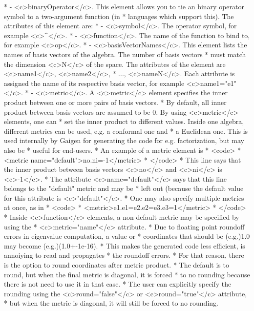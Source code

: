 \documentclass[10pt, a4paper]{article}
\begin{document}
\begin{itemize}
 *   - <c>binaryOperator</c>. This element allows you to tie an binary operator symbol to a two-argument function (in
 *     languages which support this). The attributes of this element are:
 *        - <c>symbol</c>. The operator symbol, for example <c>^</c>.
 *        - <c>function</c>. The name of the function to bind to, for example <c>op</c>.
 *   - <c>basisVectorNames</c>. This element lists the names of basis vectors of the algebra. The number of basis vectors
 *     must match the dimension <c>N</c> of the space. The attributes of the element are <c>name1</c>, <c>name2</c>, 
 *     ..., <c>nameN</c>. Each attribute is assigned the name of its respective basis vector, for example <c>name1="e1"</c>.
 *   - <c>metric</c>. A <c>metric</c> element specifies the inner product between one or more pairs of basis vectors.
 *     By default, all inner product between basis vectors are assumed to be 0. By using <c>metric</c> elements, one can
 *     set the inner product to different values. Inside one algebra, different metrics can be used, e.g. a conformal one and
 *     a Euclidean one. This is used internally by Gaigen for generating the code for e.g. factorization, but may also be
 *     useful for end-users.
 *     An example of a metric element is 
 *     <code>
 *     <metric name="default">no.ni=-1</metric>
 *     </code>
 *     This line says that the inner product between basis vectors <c>no</c> and <c>ni</c> is <c>-1</c>.
 *     The attribute <c>name="default"</c> says that this line belongs to the "default" metric and may be
 *     left out (because the default value for this attribute is <c>"default"</c>.
 *     One may also specify multiple metrics at once, as in
 *     <code>
 *     <metric>e1.e1=e2.e2=e3.e3=1</metric>
 *     </code>
 *     Inside <c>function</c> elements, a non-default metric may be specified by using the 
 *     <c>metric="name"</c> attribute.
 *     Due to floating point roundoff errors in eigenvalue computation, a value or
 *     coordinates that should be (e.g.)1.0 may become (e.g.)(1.0+-1e-16).
 *     This makes the generated code less efficient, is annoiying to read and propagates
 *     the roundoff errors.
 *     For that reason, there is the option to round coordinates after metric product.
 *     The default is to round, but when the final metric is diagonal, it is forced
 *     to no rounding because there is not need to use it in that case. 
 *     The user can explicitly specify the rounding using the <c>round="false"</c> or <c>round="true"</c> attribute,
 *     but when the metric is diagonal, it will still be forced to no rounding.

\end{itemize}
\end{document}
